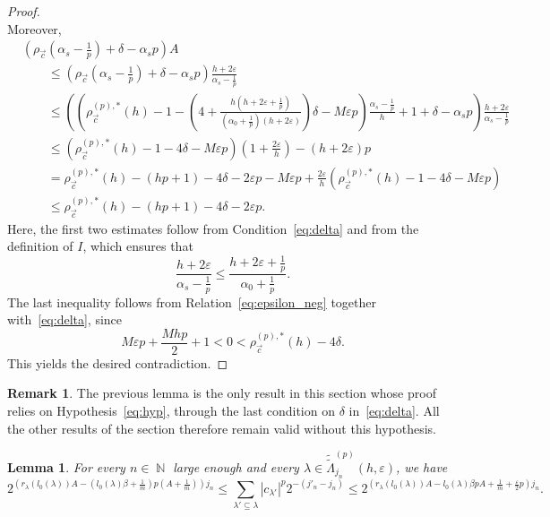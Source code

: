 \documentclass[a4paper,11pt,oneside]{article}
\DeclareMathOperator{\N}{\mathbb{N}}
\newcommand{\modu}[1]{\left\vert{#1}\right\vert}
\theoremstyle{definition}
\newtheorem{rem}[defi]{Remark}
\theoremstyle{plain}
\newtheorem{lemma}[defi]{Lemma}
\begin{document}
\begin{proof}
\[\]
Moreover,
\small
\begin{align*}
&\left(\rho_{\vec{c}}\left(\alpha_s-\frac{1}{p}\right)
+\delta-\alpha_sp\right)A \\
&\qquad \leq
\left(\rho_{\vec{c}}\left(\alpha_s-\frac{1}{p}\right)
+\delta-\alpha_sp\right)
\frac{h+2\varepsilon}{\alpha_s-\frac{1}{p}} \\
&\qquad \leq
\left(
\left(
\rho_{\vec{c}}^{(p),\ast}(h)-1
-\left(
4+
\frac{h\left(h+2\varepsilon+\frac{1}{p}\right)}
{\left(\alpha_0+\frac{1}{p}\right)(h+2\varepsilon)}
\right)\delta
-M\varepsilon p
\right)
\frac{\alpha_s-\frac{1}{p}}{h}
+1+\delta-\alpha_sp
\right)
\frac{h+2\varepsilon}{\alpha_s-\frac{1}{p}} \\
&\qquad \leq
\left(\rho_{\vec{c}}^{(p),\ast}(h)-1-4\delta-M\varepsilon p\right)
\left(1+\frac{2\varepsilon}{h}\right)
-(h+2\varepsilon)p \\
&\qquad =
\rho_{\vec{c}}^{(p),\ast}(h)-(hp+1)-4\delta-2\varepsilon p-M\varepsilon p
+\frac{2\varepsilon}{h}
\left(\rho_{\vec{c}}^{(p),\ast}(h)-1-4\delta-M\varepsilon p\right) \\
&\qquad \leq
\rho_{\vec{c}}^{(p),\ast}(h)-(hp+1)-4\delta-2\varepsilon p.
\end{align*}
\normalsize
Here, the first two estimates follow from Condition~\eqref{eq:delta} and
from the definition of $I$, which ensures that
\[
\frac{h+2\varepsilon}{\alpha_s-\frac{1}{p}}
\leq
\frac{h+2\varepsilon+\frac{1}{p}}
{\alpha_0+\frac{1}{p}}.
\]
The last inequality follows from Relation~\eqref{eq:epsilon_neg} together
with~\eqref{eq:delta}, since
\[
M\varepsilon p+\frac{Mhp}{2}+1
<0<
\rho_{\vec{c}}^{(p),\ast}(h)-4\delta.
\]
This yields the desired contradiction.
\end{proof}



\begin{rem}\label{rem:hyp}
    The previous lemma is the only result in this section whose proof relies on Hypothesis~\eqref{eq:hyp}, through the last condition on $\delta$ in~\eqref{eq:delta}. All the other results of the section therefore remain valid without this hypothesis.
\end{rem}


\begin{lemma}\label{lm:sum_order}
For every $n\in\N$ large enough and every $\lambda\in\widetilde{\widetilde{\Lambda}}_{j_n}^{(p)}(h,\varepsilon)$, we have
\[
2^{\left(r_\lambda(l_0(\lambda))A-\left(l_0(\lambda)\beta+\frac{1}{m}\right)p\left(A+\frac{1}{m}\right)\right)j_n} \leq \sum_{\lambda'\subseteq\lambda}\modu{c_{\lambda'}}^p2^{-(j'_n-j_n)}\leq 2^{\left(r_\lambda(l_0(\lambda))A-l_0(\lambda)\beta pA+\frac{1}{m}+\frac{\varepsilon}{2}p\right)j_n}.
\]\normalsize
\end{lemma}
\end{document}
